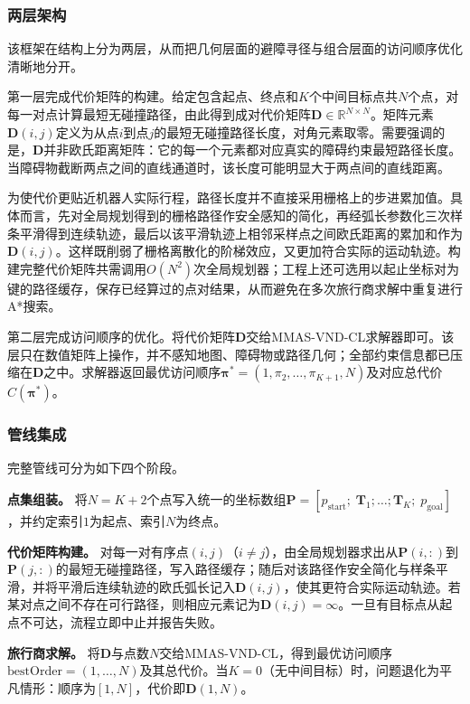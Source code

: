 \documentclass[lettersize,journal]{IEEEtran}
\begin{document}
\subsubsection{两层架构}
该框架在结构上分为两层，从而把几何层面的避障寻径与组合层面的访问顺序优化清晰地分开。

第一层完成代价矩阵的构建。给定包含起点、终点和$K$个中间目标点共$N$个点，对每一对点计算最短无碰撞路径，由此得到成对代价矩阵$\mathbf{D} \in \mathbb{R}^{N \times N}$。矩阵元素$\mathbf{D}(i, j)$定义为从点$i$到点$j$的最短无碰撞路径长度，对角元素取零。需要强调的是，$\mathbf{D}$并非欧氏距离矩阵：它的每一个元素都对应真实的障碍约束最短路径长度。当障碍物截断两点之间的直线通道时，该长度可能明显大于两点间的直线距离。

为使代价更贴近机器人实际行程，路径长度并不直接采用栅格上的步进累加值。具体而言，先对全局规划得到的栅格路径作安全感知的简化，再经弧长参数化三次样条平滑得到连续轨迹，最后以该平滑轨迹上相邻采样点之间欧氏距离的累加和作为$\mathbf{D}(i, j)$。这样既削弱了栅格离散化的阶梯效应，又更加符合实际的运动轨迹。构建完整代价矩阵共需调用$O(N^2)$次全局规划器；工程上还可选用以起止坐标对为键的路径缓存，保存已经算过的点对结果，从而避免在多次旅行商求解中重复进行A*搜索。

第二层完成访问顺序的优化。将代价矩阵$\mathbf{D}$交给MMAS-VND-CL求解器即可。该层只在数值矩阵上操作，并不感知地图、障碍物或路径几何；全部约束信息都已压缩在$\mathbf{D}$之中。求解器返回最优访问顺序$\bm{\pi}^{*} = (1, \pi_2, \dots, \pi_{K+1}, N)$及对应总代价$C(\bm{\pi}^{*})$。
\subsubsection{管线集成}
完整管线可分为如下四个阶段。

\textbf{点集组装。} 将$N = K + 2$个点写入统一的坐标数组$\mathbf{P} = [p_{\mathrm{start}};\; \mathbf{T}_1; \dots; \mathbf{T}_K;\; p_{\mathrm{goal}}]$，并约定索引$1$为起点、索引$N$为终点。

\textbf{代价矩阵构建。} 对每一对有序点$(i, j)$（$i \neq j$），由全局规划器求出从$\mathbf{P}(i,:)$到$\mathbf{P}(j,:)$的最短无碰撞路径，写入路径缓存；随后对该路径作安全简化与样条平滑，并将平滑后连续轨迹的欧氏弧长记入$\mathbf{D}(i, j)$，使其更符合实际运动轨迹。若某对点之间不存在可行路径，则相应元素记为$\mathbf{D}(i, j) = \infty$。一旦有目标点从起点不可达，流程立即中止并报告失败。

\textbf{旅行商求解。} 将$\mathbf{D}$与点数$N$交给MMAS-VND-CL，得到最优访问顺序$\mathrm{bestOrder} = (1, \dots, N)$及其总代价。当$K = 0$（无中间目标）时，问题退化为平凡情形：顺序为$[1, N]$，代价即$\mathbf{D}(1, N)$。
\end{document}
